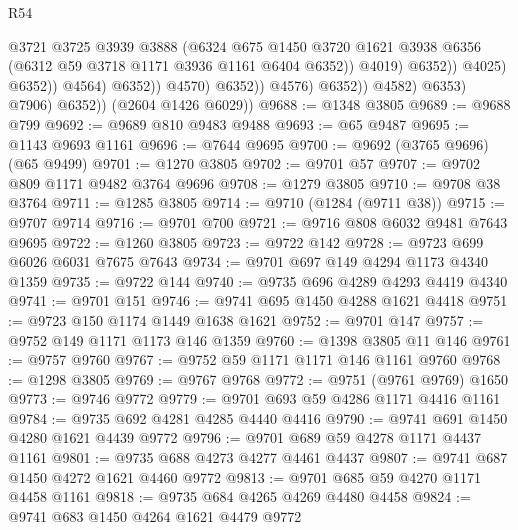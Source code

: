 \begin{lexlean}{R54}
\begin{coremodule}
                                              @3721
                                              @3725
                                              @3939
                                              @3888
                                              (@6324
                                                @675
                                                @1450
                                                @3720
                                                @1621
                                                @3938
                                                @6356
                                                (@6312 @59 @3718 @1171 @3936 @1161 @6404 @6352))
                                              @4019)
                                            @6352))
                                        @4025)
                                      @6352))
                                  @4564)
                                @6352))
                            @4570)
                          @6352))
                      @4576)
                    @6352))
                @4582)
              @6353)
            @7906)
          @6352))
      (@2604 @1426 @6029))
@9688 := @1348 @3805
@9689 := @9688 @799
@9692 := @9689 @810 @9483 @9488
@9693 := @65 @9487
@9695 := @1143 @9693 @1161
@9696 := @7644 @9695
@9700 := @9692 (@3765 @9696) (@65 @9499)
@9701 := @1270 @3805
@9702 := @9701 @57
@9707 := @9702 @809 @1171 @9482 @3764 @9696
@9708 := @1279 @3805
@9710 := @9708 @38 @3764
@9711 := @1285 @3805
@9714 := @9710 (@1284 (@9711 @38))
@9715 := @9707 @9714
@9716 := @9701 @700
@9721 := @9716 @808 @6032 @9481 @7643 @9695
@9722 := @1260 @3805
@9723 := @9722 @142
@9728 := @9723 @699 @6026 @6031 @7675 @7643
@9734 := @9701 @697 @149 @4294 @1173 @4340 @1359
@9735 := @9722 @144
@9740 := @9735 @696 @4289 @4293 @4419 @4340
@9741 := @9701 @151
@9746 := @9741 @695 @1450 @4288 @1621 @4418
@9751 := @9723 @150 @1174 @1449 @1638 @1621
@9752 := @9701 @147
@9757 := @9752 @149 @1171 @1173 @146 @1359
@9760 := @1398 @3805 @11 @146
@9761 := @9757 @9760
@9767 := @9752 @59 @1171 @1171 @146 @1161 @9760
@9768 := @1298 @3805
@9769 := @9767 @9768
@9772 := @9751 (@9761 @9769) @1650
@9773 := @9746 @9772
@9779 := @9701 @693 @59 @4286 @1171 @4416 @1161
@9784 := @9735 @692 @4281 @4285 @4440 @4416
@9790 := @9741 @691 @1450 @4280 @1621 @4439 @9772
@9796 := @9701 @689 @59 @4278 @1171 @4437 @1161
@9801 := @9735 @688 @4273 @4277 @4461 @4437
@9807 := @9741 @687 @1450 @4272 @1621 @4460 @9772
@9813 := @9701 @685 @59 @4270 @1171 @4458 @1161
@9818 := @9735 @684 @4265 @4269 @4480 @4458
@9824 := @9741 @683 @1450 @4264 @1621 @4479 @9772

\end{coremodule}
\end{lexlean}
